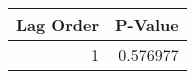 \begin{tabular}{rr}
\toprule
 Lag Order &  P-Value \\
\midrule
         1 & 0.576977 \\
\bottomrule
\end{tabular}

